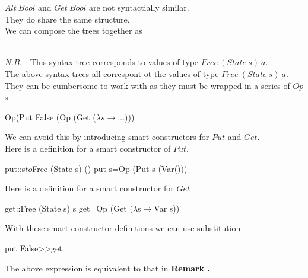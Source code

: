 \documentclass[11pt,a4paper]{article}
\begin{document}
$Alt\ Bool$ and $Get\ Bool$ are not syntactially similar.\\
They do share the same structure.\\
We can compose the trees together as\\
\\
\textit{N.B.} - This syntax tree corresponds to values of type $Free\ (State\ s)\ a$.\\

The above syntax trees all correspont ot the values of type $Free\ (State\ s)\ a$.\\
They can be cumbersome to work with as they must be wrapped in a series of $Op$s
\begin{code}
Op(Put False (Op (Get ($\lambda s\to\dots$)))
\end{code}
We can avoid this by introducing smart constructors for $Put$ and $Get$.\\

Here is a definition for a smart constructor of $Put$.
\begin{code}
put::s$to$Free (State s) ()
put s=Op (Put s (Var()))
\end{code}

Here is a definition for a smart constructor for $Get$
\begin{code}
get::Free (State s) s
get=Op (Get ($\lambda$s$\to$Var s))
\end{code}

With these smart constructor definitions we can use substitution
\begin{code}
put False>>get
\end{code}
The above expression is equivalent to that in \textbf{Remark .}
\end{document}
